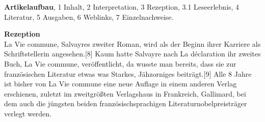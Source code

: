 \documentclass[fontsize=12pt]{scrartcl}
\begin{document}
\textbf{Artikelaufbau}, 1 Inhalt, 2 Interpretation, 3 Rezeption, 3.1 Leseerlebnis, 4 Li\-te\-ra\-tur, 5 Ausgaben, 6 Weblinks, 7 Einzelnachweise.

\textbf{Rezeption}\\
La Vie commune, Salvayres zweiter Roman, wird als der Beginn ihrer Karriere als Schriftstellerin angesehen.[8] Kaum hatte Salvayre nach La d\'{e}claration ihr zweites Buch, La Vie commune, ver\"of\-fent\-licht, da wusste man bereits, dass sie zur fran\-z\"o\-si\-schen Li\-te\-ra\-tur etwas was Starkes, J\"ahzorniges beitr\"agt.[9] Alle 8 Jahre ist bis\-her von La Vie commune eine neue Auflage in einem anderen Verlag erschienen, zu\-letzt im zweitgr\"o{\ss}ten Verlagshaus in Frankreich, Gallimard, bei dem auch die j\"ungsten beiden franz\"osischspra\-chi\-gen Li\-te\-ra\-tur\-nobelpreistr\"ager verlegt werden.
\end{document}
